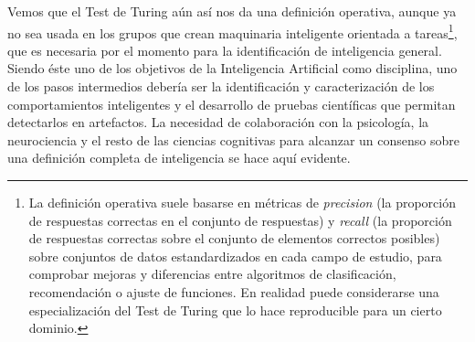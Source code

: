 \documentclass[12pt]{memoir}
\begin{document}
Vemos que el Test de Turing aún así nos da una definición operativa, aunque ya no sea usada en los grupos que crean maquinaria inteligente orientada a tareas\footnote{La definición operativa suele basarse en métricas de \textit{precision} (la proporción de respuestas correctas en el conjunto de respuestas) y \textit{recall} (la proporción de respuestas correctas sobre el conjunto de elementos correctos posibles) sobre conjuntos de datos estandardizados en cada campo de estudio, para comprobar mejoras y diferencias entre algoritmos de clasificación, recomendación o ajuste de funciones. En realidad puede considerarse una especialización del Test de Turing que lo hace reproducible para un cierto dominio.}, que es necesaria por el momento para la identificación de inteligencia general. Siendo éste uno de los objetivos de la Inteligencia Artificial como disciplina, uno de los pasos intermedios debería ser la identificación y caracterización de los comportamientos inteligentes y el desarrollo de pruebas científicas que permitan detectarlos en artefactos. La necesidad de colaboración con la psicología, la neurociencia y el resto de las ciencias cognitivas para alcanzar un consenso sobre una definición completa de inteligencia se hace aquí evidente.


\newpage
\end{document}
